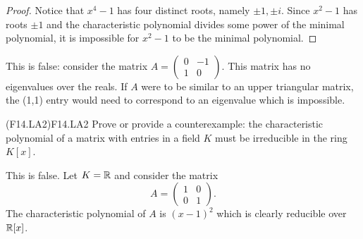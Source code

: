 \documentclass[../AlgebraQualSolutions.tex]{subfiles}
\begin{document}
	\begin{proof}
		Notice that $x^4 - 1$ has four distinct roots, namely $\pm 1, \pm i$. Since $x^2 - 1$ has roots $\pm 1$ and the characteristic polynomial divides some power of the minimal polynomial, it is impossible for $x^2 -1$ to be the minimal polynomial.
	\end{proof}
	
	\begin{solution}
		This is false: consider the matrix $A = \begin{pmatrix} 0 & -1\\ 1 & 0\end{pmatrix}$. This matrix has no eigenvalues over the reals. If $A$ were to be similar to an upper triangular matrix, the (1,1) entry would need to correspond to an eigenvalue which is impossible.
	\end{solution}

\begin{prob}{(F14.LA2)}{F14.LA2}
	Prove or provide a counterexample: the characteristic polynomial of a matrix with entries in a field $K$ must be irreducible in the ring $K[x]$.
\end{prob}

\begin{solution}
	This is false. Let $K = \mathbb{R}$ and consider the matrix
		\[A = \begin{pmatrix} 1 & 0 \\ 0 & 1 \end{pmatrix}. \]
	The characteristic polynomial of $A$ is $(x-1)^2$ which is clearly reducible over $\mathbb{R}[x]$.
\end{solution}
\end{document}
